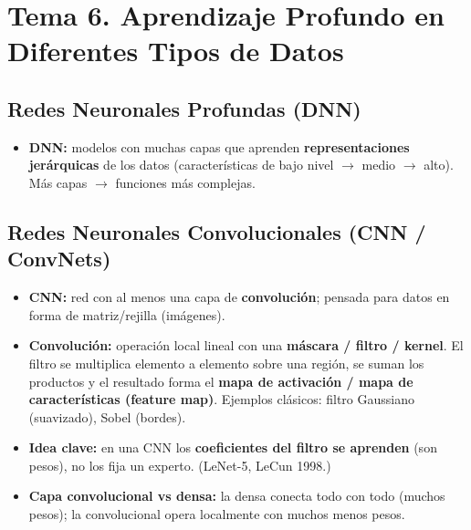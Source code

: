 \documentclass[12pt]{book} %
\providecommand{\tightlist}{%
  \setlength{\itemsep}{0pt}\setlength{\parskip}{0pt}}
\begin{document}
\hypertarget{tema-6.-aprendizaje-profundo-en-diferentes-tipos-de-datos}{%
\section{Tema 6. Aprendizaje Profundo en Diferentes Tipos de
Datos}\label{tema-6.-aprendizaje-profundo-en-diferentes-tipos-de-datos}}

\hypertarget{redes-neuronales-profundas-dnn}{%
\subsection{Redes Neuronales Profundas
(DNN)}\label{redes-neuronales-profundas-dnn}}

\begin{itemize}
\tightlist
\item
  \textbf{DNN:} modelos con muchas capas que aprenden
  \textbf{representaciones jerárquicas} de los datos (características de
  bajo nivel \(\to\) medio \(\to\) alto). Más capas \(\to\) funciones
  más complejas.
\end{itemize}

\hypertarget{redes-neuronales-convolucionales-cnn-convnets}{%
\subsection{Redes Neuronales Convolucionales (CNN /
ConvNets)}\label{redes-neuronales-convolucionales-cnn-convnets}}

\begin{itemize}
\tightlist
\item
  \textbf{CNN:} red con al menos una capa de \textbf{convolución};
  pensada para datos en forma de matriz/rejilla (imágenes).
\item
  \textbf{Convolución:} operación local lineal con una \textbf{máscara /
  filtro / kernel}. El filtro se multiplica elemento a elemento sobre
  una región, se suman los productos y el resultado forma el
  \textbf{mapa de activación / mapa de características (feature map)}.
  Ejemplos clásicos: filtro Gaussiano (suavizado), Sobel (bordes).
\item
  \textbf{Idea clave:} en una CNN los \textbf{coeficientes del filtro se
  aprenden} (son pesos), no los fija un experto. (LeNet-5, LeCun 1998.)
\item
  \textbf{Capa convolucional vs densa:} la densa conecta todo con todo
  (muchos pesos); la convolucional opera localmente con muchos menos
  pesos.
\end{itemize}
\end{document}

